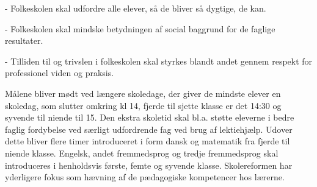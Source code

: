 -         Folkeskolen skal udfordre alle elever, så de bliver så dygtige, de kan.

-	Folkeskolen skal mindske betydningen af social baggrund for de faglige resultater.

-	Tilliden til og trivslen i folkeskolen skal styrkes blandt andet gennem respekt for professionel viden og praksis.

Målene bliver mødt ved længere skoledage, der giver de mindste elever en skoledag, som slutter omkring kl 14, fjerde til sjette klasse er det  14:30 og syvende til niende til 15. Den ekstra skoletid skal bl.a. støtte eleverne i bedre faglig fordybelse ved særligt udfordrende fag ved brug af lektiehjælp. Udover dette bliver flere timer introduceret i form dansk og matematik fra fjerde til niende klasse. Engelsk, andet fremmedsprog og tredje fremmedsprog skal introduceres i henholdsvis første, femte og syvende klasse.
Skolereformen har yderligere fokus som hævning af de pædagogiske kompetencer hos lærerne.
